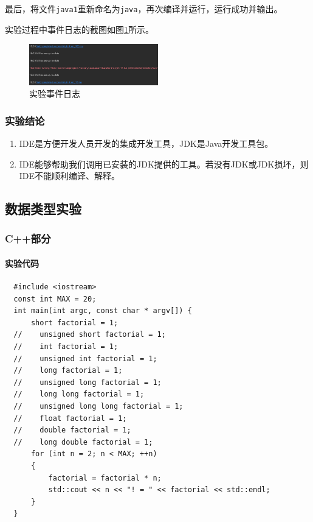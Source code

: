 \documentclass[11pt]{homework}
\begin{document}
最后，将文件\verb|java1|重新命名为\verb|java|，再次编译并运行，运行成功并输出。

实验过程中事件日志的截图如图\ref{event_log}所示。
\begin{figure}
  \centering
  \includegraphics[width=0.5\textwidth]{event_log}
  \caption{实验事件日志}
  \label{event_log}
\end{figure}

\subsubsection*{实验结论}
\begin{enumerate}
  \item IDE是方便开发人员开发的集成开发工具，JDK是Java开发工具包。
  \item IDE能够帮助我们调用已安装的JDK提供的工具。若没有JDK或JDK损坏，则IDE不能顺利编译、解释。
\end{enumerate}

\subsection*{数据类型实验}

\subsubsection*{C++部分}

\paragraph{实验代码}
\lstset{language=c++}
\begin{lstlisting}
  #include <iostream>
  const int MAX = 20;
  int main(int argc, const char * argv[]) {
      short factorial = 1;
  //    unsigned short factorial = 1;
  //    int factorial = 1;
  //    unsigned int factorial = 1;
  //    long factorial = 1;
  //    unsigned long factorial = 1;
  //    long long factorial = 1;
  //    unsigned long long factorial = 1;
  //    float factorial = 1;
  //    double factorial = 1;
  //    long double factorial = 1;
      for (int n = 2; n < MAX; ++n)
      {
          factorial = factorial * n;
          std::cout << n << "! = " << factorial << std::endl;
      }
  }
\end{lstlisting}
\end{document}
